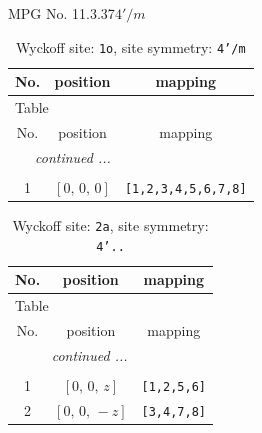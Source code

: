 \documentclass[fleqn,8pt]{jsarticle}
\begin{document}
\setcounter{MaxMatrixCols}{32}

\renewcommand{\tablename}{Table~}
\renewcommand{\figurename}{Figure~}
\begin{center}
\LARGE
MPG No. 11.3.37\quad$4'/m$
\end{center}
\renewcommand{\arraystretch}{1.2}
\begin{longtable}{ccc}
\caption{Wyckoff site: {\tt 1o}, site symmetry: {\tt 4'/m}}
 \\
 \hline \hline
No. & position & mapping \\ \hline \endfirsthead

\multicolumn{2}{l}{\tablename\ \thetable{}} \\
 \hline \hline
No. & position & mapping \\ \hline \endhead

 \hline \hline
\multicolumn{2}{r}{\footnotesize\it continued ...} \\ \endfoot

 \hline \hline
\multicolumn{2}{r}{} \\ \endlastfoot

1 & $\left[ 0,\, 0,\, 0 \right]$ & {\tt [1,2,3,4,5,6,7,8]} \\
\end{longtable}
\renewcommand{\arraystretch}{1.2}
\begin{longtable}{ccc}
\caption{Wyckoff site: {\tt 2a}, site symmetry: {\tt 4'..}}
 \\
 \hline \hline
No. & position & mapping \\ \hline \endfirsthead

\multicolumn{2}{l}{\tablename\ \thetable{}} \\
 \hline \hline
No. & position & mapping \\ \hline \endhead

 \hline \hline
\multicolumn{2}{r}{\footnotesize\it continued ...} \\ \endfoot

 \hline \hline
\multicolumn{2}{r}{} \\ \endlastfoot

1 & $\left[ 0,\, 0,\, z \right]$ & {\tt [1,2,5,6]} \\ \hline
2 & $\left[ 0,\, 0,\, - z \right]$ & {\tt [3,4,7,8]} \\
\end{longtable}
\renewcommand{\arraystretch}{1.2}
\end{document}
